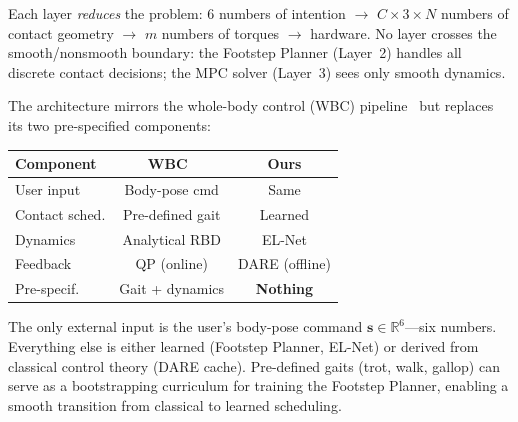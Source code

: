 \documentclass[letterpaper, 10pt, conference]{IEEEtran}
\newcommand{\R}{\mathbb{R}}
\begin{document}
Each layer \emph{reduces} the problem:
$6$ numbers of intention $\to$
$C \times 3 \times N$ numbers of contact geometry $\to$
$m$ numbers of torques $\to$ hardware.
No layer crosses the smooth/nonsmooth boundary:
the Footstep Planner (Layer~2) handles all discrete contact
decisions; the MPC solver (Layer~3) sees only smooth dynamics.

The architecture mirrors the whole-body control (WBC)
pipeline~\cite{kim2019} but replaces its two pre-specified
components:

\begin{center}
\small
\begin{tabular}{@{}lcc@{}}
\toprule
Component & WBC~\cite{kim2019} & Ours \\
\midrule
User input       & Body-pose cmd   & Same \\
Contact sched.   & Pre-defined gait    & Learned \\
Dynamics         & Analytical RBD      & EL-Net \\
Feedback         & QP (online)         & DARE (offline) \\
Pre-specif.      & Gait + dynamics    & \textbf{Nothing} \\
\bottomrule
\end{tabular}
\end{center}

\noindent
The only external input is the user's body-pose command
$\bm{s} \in \R^6$---six numbers.
Everything else is either learned (Footstep Planner, EL-Net)
or derived from classical control theory (DARE cache).
Pre-defined gaits (trot, walk, gallop) can serve as a
bootstrapping curriculum for training the Footstep Planner,
enabling a smooth transition from classical to learned scheduling.
\end{document}
